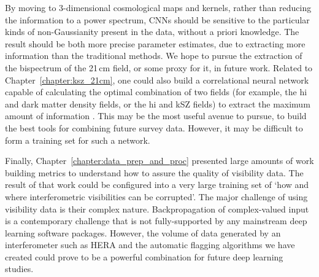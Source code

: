 By moving to 3-dimensional cosmological maps and kernels, rather than reducing the information to a power spectrum, CNNs should be sensitive to the particular kinds of non-Gaussianity present in the data, without a priori knowledge. The result should be both more precise parameter estimates, due to extracting more information than the traditional methods. We hope to pursue the extraction of the bispectrum of the 21\,cm field, or some proxy for it, in future work.
Related to Chapter~\ref{chapter:ksz_21cm}, one could also build a correlational neural network \citep{Chandar.15} capable of calculating the optimal combination of two fields (for example, the {\sc hi} and dark matter density fields, or the {\sc hi} and kSZ fields) to extract the maximum amount of information \citep{Feng.04}. This may be the most useful avenue to pursue, to build the best tools for combining future survey data. However, it may be difficult to form a training set for such a network.

Finally, Chapter~\ref{chapter:data_prep_and_proc} presented large amounts of work building metrics to understand how to assure the quality of visibility data. The result of that work could be configured into a very large training set of `how and where interferometric visibilities can be corrupted'. The major challenge of using visibility data is their complex nature. Backpropagation of complex-valued input is a contemporary challenge \citep{Guberman.16, Popa.17complex, Zhang.17complex} that is not fully-supported by any mainstream deep learning software packages. However, the volume of data generated by an interferometer such as HERA and the automatic flagging algorithms we have created could prove to be a powerful combination for future deep learning studies.